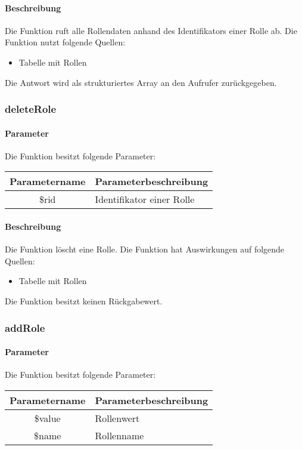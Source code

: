 \paragraph{Beschreibung} Die Funktion ruft alle Rollendaten anhand des Identifikators einer Rolle ab. Die Funktion nutzt folgende Quellen:
\begin{itemize}
	\item Tabelle mit Rollen
\end{itemize}
Die Antwort wird als strukturiertes Array an den Aufrufer zurückgegeben.
\subsubsection{deleteRole}
\paragraph{Parameter} Die Funktion besitzt folgende Parameter:
\begin{table}[H]
	\begin{tabular}{|c|p{11cm}|}
		\hline
		\textbf{Parametername} & \textbf{Parameterbeschreibung} \\ \hline
		\$rid & Identifikator einer Rolle \\ \hline
	\end{tabular}
\end{table}
\paragraph{Beschreibung} Die Funktion löscht eine Rolle. Die Funktion hat Auswirkungen auf folgende Quellen:
\begin{itemize}
	\item Tabelle mit Rollen
\end{itemize}
Die Funktion besitzt keinen Rückgabewert.
\subsubsection{addRole}
\paragraph{Parameter} Die Funktion besitzt folgende Parameter:
\begin{table}[H]
	\begin{tabular}{|c|p{11cm}|}
		\hline
		\textbf{Parametername} & \textbf{Parameterbeschreibung} \\ \hline
		\$value & Rollenwert \\ \hline
		\$name  & Rollenname \\ \hline
	\end{tabular}
\end{table}
